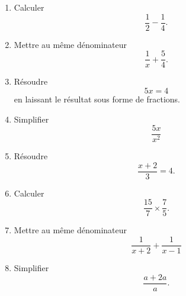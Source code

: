 
\begin{exercice}\label{exosmath-0018}

    \begin{multicols}{2}
    \begin{enumerate}
        \item
            Calculer
            \begin{equation}
                \frac{ 1 }{2}-\frac{1}{ 4 }.
            \end{equation}
        \item
            Mettre au même dénominateur
            \begin{equation}
                \frac{1}{ x }+\frac{ 5 }{ 4 }.
            \end{equation}
        \item
            Résoudre 
            \begin{equation}
                5x=4
            \end{equation}
            en laissant le résultat sous forme de fractions.
        \item
            Simplifier
            \begin{equation}
                \frac{ 5x }{ x^2 }
            \end{equation}


        \item
            Résoudre
            \begin{equation}
                \frac{ x+2 }{ 3 }=4.
            \end{equation}
        \item
            Calculer
            \begin{equation}
                \frac{ 15 }{ 7 }\times \frac{ 7 }{ 5 }.
            \end{equation}
        \item
            Mettre au même dénominateur
            \begin{equation}
                \frac{1}{ x+2 }+\frac{1}{ x-1 }
            \end{equation}
        \item
            Simplifier 
            \begin{equation}
                \frac{ a+2a }{ a }.
            \end{equation}



\end{enumerate}
\end{multicols}
\end{exercice}
